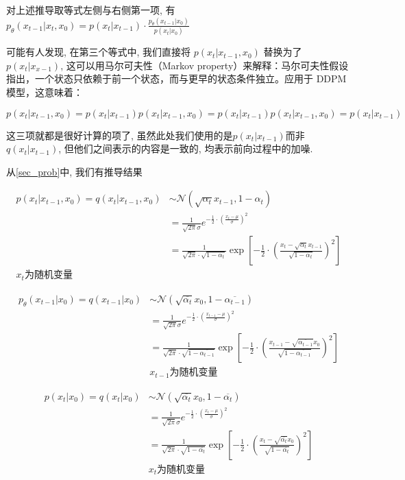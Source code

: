 对上述推导取等式左侧与右侧第一项, 有 $p_\theta(x_{t-1}|x_t,x_0)=p(x_t|x_{t-1}) \cdot \frac{p_\theta(x_{t-1}|x_0)}{p(x_t|x_0)}$

可能有人发现, 在第三个等式中, 我们直接将 $p(x_t|x_{t-1},x_0)$ 替换为了 $p(x_t|x_{x-1})$, 这可以用马尔可夫性（Markov property）来解释：马尔可夫性假设指出，一个状态只依赖于前一个状态，而与更早的状态条件独立。应用于 DDPM 模型，这意味着：

$p(x_t|x_{t-1},x_0)=p(x_t|x_{t-1})p(x_t | x_{t-1}, x_0) = p(x_t | x_{t-1})p(x_t|x_{t-1},x_0)=p(x_t|x_{t-1})$

这三项就都是很好计算的项了, 虽然此处我们使用的是$p(x_{t}|x_{t-1})$而非$q(x_t|x_{t-1})$, 但他们之间表示的内容是一致的, 均表示前向过程中的加噪.

从\ref{sec_prob}中, 我们有推导结果


\begin{equation}
    \begin{aligned}
        p(x_t|x_{t-1},x_0)= q(x_t|x_{t-1},x_0)&\sim \mathcal{N}(\sqrt{\alpha_t}x_{t-1}, 1-\alpha_t)\\
        &=\frac{1}{\sqrt{2\pi}\sigma}e^{-\frac{1}{2}\cdot(\frac{x_t-\mu}{\sigma})^2}\\
        &= \frac{1}{\sqrt{2\pi}\cdot\sqrt{1-\alpha_t}}\exp\left[{-\frac{1}{2}\cdot\left(\frac{x_t-\sqrt{\alpha_t}x_{t-1}}{\sqrt{1-\alpha_t}}\right)^2}\right]\\
        \text{$x_t$为随机变量}
    \end{aligned}
\end{equation}

\begin{equation}
    \begin{aligned}
        p_\theta(x_{t-1}\vert x_0)=q(x_{t-1}\vert x_0)&\sim \mathcal{N}(\sqrt{\overline{\alpha_t}}x_0,1-\overline{\alpha_{t-1}})\\
        &=\frac{1}{\sqrt{2\pi}\sigma}e^{-\frac{1}{2}\cdot(\frac{x_{t-1}-\mu}{\sigma})^2}\\
        &= \frac{1}{\sqrt{2\pi}\cdot\sqrt{1-\overline{\alpha_{t-1}}}}\exp\left[{-\frac{1}{2}\cdot\left(\frac{x_{t-1}-\sqrt{\overline{\alpha_{t-1}}}x_0}{\sqrt{1-\overline{\alpha_{t-1}}}}\right)^2}\right]\\
        &\text{$x_{t-1}$为随机变量}
    \end{aligned}
\end{equation}


\begin{equation}
    \begin{aligned}
        p(x_t\vert x_0)=q(x_t\vert x_0)&\sim \mathcal{N}(\sqrt{\overline{\alpha_t}}x_0,1-\overline{\alpha_t})\\
        &=\frac{1}{\sqrt{2\pi}\sigma}e^{-\frac{1}{2}\cdot(\frac{x_t-\mu}{\sigma})^2}\\
        &= \frac{1}{\sqrt{2\pi}\cdot\sqrt{1-\overline{\alpha_t}}}\exp\left[{-\frac{1}{2}\cdot\left(\frac{x_t-\sqrt{\overline{\alpha_t}}x_0}{\sqrt{1-\overline{\alpha_t}}}\right)^2}\right]\\
        &\text{$x_t$为随机变量}
    \end{aligned}
\end{equation}


